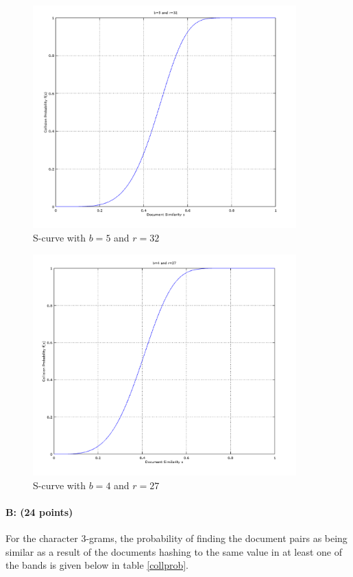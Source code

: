 \documentclass[11pt]{article}
\begin{document}
\begin{figure}[!htb]
\centering
\includegraphics[width=4in]{figures/1stCut.png}
\caption{S-curve with $b=5$ and $r=32$}
\label{1stCut}
\end{figure}

\begin{figure}[!htb]
\centering
\includegraphics[width=4in]{figures/final.png}
\caption{S-curve with $b=4$ and $r=27$}
\label{final}
\end{figure}

\paragraph{B: (24 points)} 

For the character $3$-grams, the probability of finding the document pairs as being similar as a result of the documents hashing to the same value in at least one of the bands is given below in table \ref{collprob}.
\end{document}
